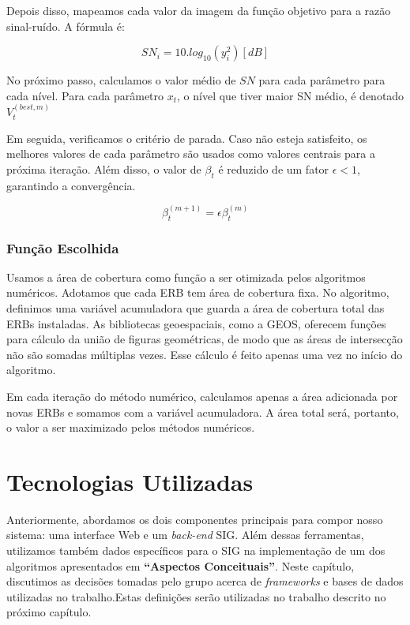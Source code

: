 \documentclass[]{politex}
\begin{document}
Depois disso, mapeamos cada valor da imagem da função objetivo para a razão
sinal-ruído. A fórmula é:

\begin{equation*}
    SN_i = 10.log_{10}(y_i^2) [dB]
\end{equation*}

No próximo passo, calculamos o valor médio de $SN$ para cada parâmetro para cada
nível. Para cada parâmetro $x_t$, o nível que tiver maior SN médio, é denotado
$V_t^{(best, m)}$

Em seguida, verificamos o critério de parada. Caso não esteja satisfeito, os
melhores valores de cada parâmetro são usados como valores centrais para a
próxima iteração. Além disso, o valor de $\beta_t$ é reduzido de um fator
$\epsilon < 1$, garantindo a convergência.

\begin{equation*}
    \beta_t^{(m+1)} = \epsilon\beta_t^{(m)}
\end{equation*}

\subsection{Função Escolhida}

Usamos a área de cobertura como função a ser otimizada pelos algoritmos
numéricos. Adotamos que cada ERB tem área de cobertura fixa. No algoritmo,
definimos uma variável acumuladora que guarda a área de cobertura total das ERBs
instaladas. As bibliotecas geoespaciais, como a GEOS, oferecem funções para
cálculo da união de figuras geométricas, de modo que as áreas de intersecção não
são somadas múltiplas vezes. Esse cálculo é feito apenas uma vez no início do
algoritmo.

Em cada iteração do método numérico, calculamos apenas a área adicionada por
novas ERBs e somamos com a variável acumuladora. A área total será, portanto, o
valor a ser maximizado pelos métodos numéricos.

\chapter{Tecnologias Utilizadas}

Anteriormente, abordamos os dois componentes principais para compor nosso
sistema: uma interface Web e um \textit{back-end} SIG. Além dessas ferramentas,
utilizamos também dados específicos para o SIG na implementação de um dos
algoritmos apresentados em \textbf{``Aspectos Conceituais''}. Neste capítulo,
discutimos as decisões tomadas pelo grupo acerca de \emph{frameworks} e bases de
dados utilizadas no trabalho.Estas definições serão utilizadas no trabalho
descrito no próximo capítulo.
\end{document}

